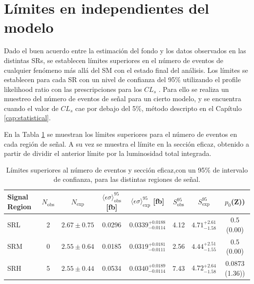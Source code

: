 \section{Límites en independientes del modelo}

Dado el buen acuerdo entre la estimación del fondo y los datos observados en las distintas SRs, se establecen límites superiores en el número de eventos de cualquier fenómeno más allá del SM con el estado final del análisis. Los límites se establecen para cada SR con un nivel de confianza del 95\% utilizando el profile likelihood ratio con las prescripciones para los $CL_s$ \cite{Read:2002hq}. Para ello se realiza un muestreo del número de eventos de señal para un cierto modelo, y se encuentra cuando el valor de $CL_s$ cae por debajo del 5\%, método descripto en el Capítulo \ref{cap:statistical}.

En la Tabla \ref{tab:model_indep_ul} se muestran los límites superiores para el número de eventos en cada región de señal. A su vez se muestra el límite en la sección eficaz, obtenido a partir de dividir el anterior límite por la luminosidad total integrada. 


\begin{table}[!h]
  \centering
  \caption{Límites superiores al número de eventos y sección eficaz,con un 95\% de intervalo de confianza, para las distintas regiones de señal. }

  \begin{tabular}{l|c|c|ccccc}
    \hline
    \hline
    Signal Region & $N_{\mathrm{obs}}$  & $N_{\mathrm{exp}}$  & $\langle\epsilon{\sigma}\rangle_{\mathrm{obs}}^{95}$ [fb]  & $\langle\epsilon{\sigma}\rangle_{\mathrm{exp}}^{95}$ [fb] & $S_{\mathrm{obs}}^{95}$  & $S_{\mathrm{exp}}^{95}$ & $p_{0}$(Z))\\
    \hline
    SRL           & 2                   & $2.67 \pm 0.75$     &               0.0296                                       &         $0.0339^{+0.0188}_{-0.0114}$               &                       4.12  &  $4.71^{+2.61}_{-1.58}$ &  0.5 (0.00) \\
    SRM           & 0                   & $2.55 \pm 0.64$     &               0.0185                                       &         $0.0319^{+0.0181}_{-0.0111}$               &                       2.56  &  $4.44^{+2.51}_{-1.55}$ &  0.5 (0.00) \\
    SRH           & 5                   & $2.55 \pm 0.44$     &               0.0534                                       &         $0.0340^{+0.0189}_{-0.0114}$               &                       7.43  &  $4.72^{+2.64}_{-1.58}$ & 0.0873 (1.36)) \\
    \hline
    \hline
  \end{tabular}
  \label{tab:model_indep_ul}
\end{table}


